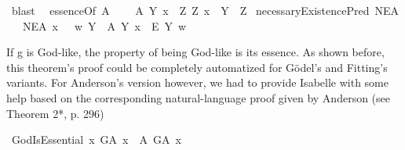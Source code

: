 \begin{isabellebody}
\ blast\ %
%
%
%
\isanewline
\isanewline
{}\isamarkupfalse%
\ essenceOf{\isacharcolon}{\isacharcolon}{\isachardoublequoteopen}{\isasymup}{\isasymlangle}{\isasymup}{\isasymlangle}{\isasymzero}{\isasymrangle}{\isacharcomma}{\isasymzero}{\isasymrangle}{\isachardoublequoteclose}\ {\isacharparenleft}{\isachardoublequoteopen}{\isasymE}\isactrlsup A{\isachardoublequoteclose}{\isacharparenright}\ \ %
\isanewline
\ \ {\isachardoublequoteopen}{\isasymE}\isactrlsup A\ Y\ x\ {\isasymequiv}\ {\isacharparenleft}\isactrlbold {\isasymforall}Z{\isachardot}\ \isactrlbold {\isasymbox}{\isacharparenleft}Z\ x{\isacharparenright}\ \isactrlbold {\isasymleftrightarrow}\ Y\ {\isasymRrightarrow}\ Z{\isacharparenright}{\isachardoublequoteclose}\isanewline
{}\isamarkupfalse%
\ necessaryExistencePred{\isacharcolon}{\isacharcolon}{\isachardoublequoteopen}{\isasymup}{\isasymlangle}{\isasymzero}{\isasymrangle}{\isachardoublequoteclose}\ {\isacharparenleft}{\isachardoublequoteopen}NE\isactrlsup A{\isachardoublequoteclose}{\isacharparenright}\isanewline
\ \ \ {\isachardoublequoteopen}NE\isactrlsup A\ x\ \ {\isasymequiv}\ {\isacharparenleft}{\isasymlambda}w{\isachardot}\ {\isacharparenleft}\isactrlbold {\isasymforall}Y{\isachardot}\ \ {\isasymE}\isactrlsup A\ Y\ x\ \isactrlbold {\isasymrightarrow}\ \isactrlbold {\isasymbox}\isactrlbold {\isasymexists}\isactrlsup E\ Y{\isacharparenright}\ w{\isacharparenright}{\isachardoublequoteclose}%
\begin{isamarkuptext}%
If g is God-like, the property of being God-like is its essence.
As shown before, this theorem's proof could be completely automatized for G\"odel's and Fitting's variants.
For Anderson's version however, we had to provide Isabelle with some help based on the corresponding natural-language proof 
given by Anderson (see \cite{anderson90:_some_emend_of_goedel_ontol_proof} Theorem 2*, p. 296)%
\end{isamarkuptext}\isamarkuptrue%
\isamarkupfalse%
\ GodIsEssential{\isacharcolon}\ {\isachardoublequoteopen}{\isasymlfloor}\isactrlbold {\isasymforall}x{\isachardot}\ G\isactrlsup A\ x\ \isactrlbold {\isasymrightarrow}\ {\isacharparenleft}{\isasymE}\isactrlsup A\ G\isactrlsup A\ x{\isacharparenright}{\isasymrfloor}{\isachardoublequoteclose}%
\ %
%
\isamarkupfalse%
\ {\isacharminus}\ %
%
%
%
\ \ \isamarkupfalse%

\end{isabellebody}
